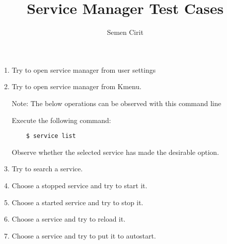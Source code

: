 \documentclass[a4paper,10pt]{article}
\title{Service Manager Test Cases}
\author{Semen Cirit}
\begin{document}
\maketitle
\begin{enumerate}
\item Try to open service manager from user settings

\item Try to open service manager from Kmenu.

Note: The below operations can be observed with this command line 

Execute the following command:
\begin{verbatim}
    $ service list
\end{verbatim}

Observe whether the selected service has made the desirable option.



\item Try to search a service.

\item Choose a stopped service and try to start it.

\item Choose a started service and try to stop  it.

\item Choose a service and try to reload it.

\item Choose a service and try to put it to autostart.

\end{enumerate}
\end{document}
